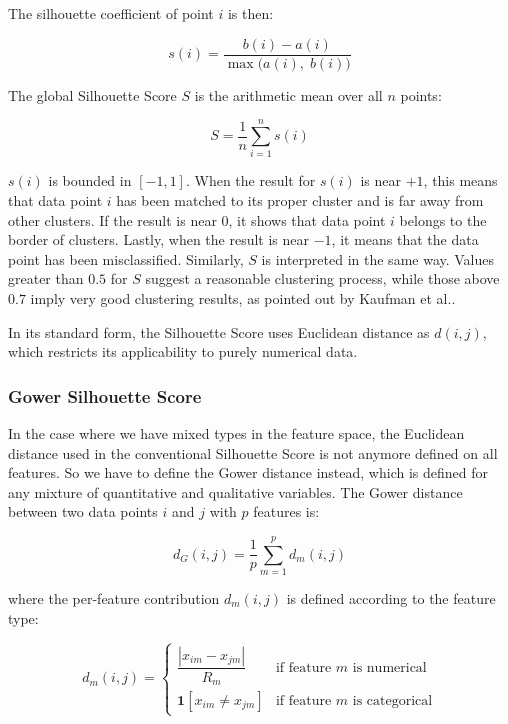 The silhouette coefficient of point $i$ is then:

\begin{equation}
    s(i) = \frac{b(i) - a(i)}{\max\bigl(a(i),\; b(i)\bigr)}
    \label{eq:silhouette_si}
\end{equation}

The global Silhouette Score $S$ is the arithmetic mean over all $n$ points:

\begin{equation}
    S = \frac{1}{n} \sum_{i=1}^{n} s(i)
    \label{eq:silhouette_global}
\end{equation}

$s(i)$ is bounded in $[-1, 1]$. When the result for $s(i)$ is near $+1$, this means that data point $i$ has been matched to its proper cluster and is far away from other clusters. If the result is near $0$, it shows that data point $i$ belongs to the border of clusters. Lastly, when the result is near $-1$, it means that the data point has been misclassified. Similarly, $S$ is interpreted in the same way. Values greater than $0.5$ for $S$ suggest a reasonable clustering process, while those above $0.7$ imply very good clustering results, as pointed out by Kaufman et al.\cite{kaufman1990}.

In its standard form, the Silhouette Score uses Euclidean distance as $d(i,j)$, which restricts its applicability to purely numerical data.

\subsubsection*{Gower Silhouette Score}

In the case where we have mixed types in the feature space, the Euclidean distance used in the conventional Silhouette Score is not anymore defined on all features. So we have to define the Gower distance \cite{gower1971} instead, which is defined for any mixture of quantitative and qualitative variables. The Gower distance between two data points $i$ and $j$ with $p$ features is:

\begin{equation}
    d_G(i, j) = \frac{1}{p} \sum_{m=1}^{p} d_m(i, j)
    \label{eq:gower}
\end{equation}

where the per-feature contribution $d_m(i, j)$ is defined according to the feature type:

\begin{equation}
    d_m(i, j) =
    \begin{cases}
        \dfrac{|x_{im} - x_{jm}|}{R_m} & \text{if feature } m \text{ is numerical} \\[8pt]
        \mathbf{1}[x_{im} \neq x_{jm}]  & \text{if feature } m \text{ is categorical}
    \end{cases}
    \label{eq:gower_dm}
\end{equation}

